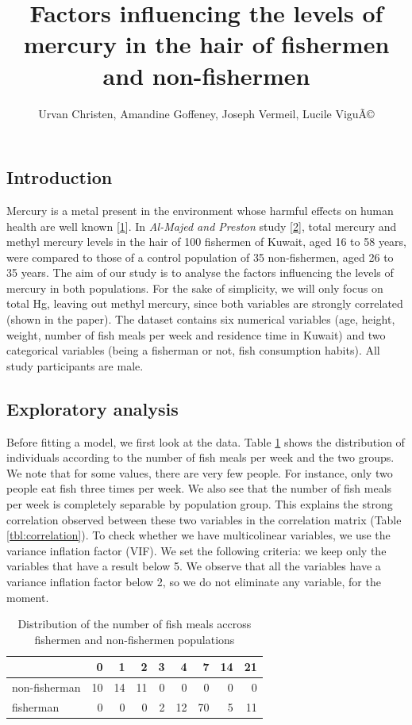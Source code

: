 \documentclass[12pt,]{article}
\title{Factors influencing the levels of mercury in the hair of fishermen and
non-fishermen}
\author{Urvan Christen, Amandine Goffeney, Joseph Vermeil, Lucile ViguÃ©}
\date{}
\begin{document}
\maketitle

\subsection{Introduction}\label{introduction}

Mercury is a metal present in the environment whose harmful effects on
human health are well known
{[}\protect\hyperlink{ref-park2012human}{1}{]}. In \emph{Al-Majed and
Preston} study {[}\protect\hyperlink{ref-al2000factors}{2}{]}, total
mercury and methyl mercury levels in the hair of 100 fishermen of
Kuwait, aged 16 to 58 years, were compared to those of a control
population of 35 non-fishermen, aged 26 to 35 years. The aim of our
study is to analyse the factors influencing the levels of mercury in
both populations. For the sake of simplicity, we will only focus on
total Hg, leaving out methyl mercury, since both variables are strongly
correlated (shown in the paper). The dataset contains six numerical
variables (age, height, weight, number of fish meals per week and
residence time in Kuwait) and two categorical variables (being a
fisherman or not, fish consumption habits). All study participants are
male.

\subsection{Exploratory analysis}\label{exploratory-analysis}

Before fitting a model, we first look at the data. Table
\ref{tbl:fishmlwk} shows the distribution of individuals according to
the number of fish meals per week and the two groups. We note that for
some values, there are very few people. For instance, only two people
eat fish three times per week. We also see that the number of fish meals
per week is completely separable by population group. This explains the
strong correlation observed between these two variables in the
correlation matrix (Table \ref{tbl:correlation}). To check whether we
have multicolinear variables, we use the variance inflation factor
(VIF). We set the following criteria: we keep only the variables that
have a result below 5. We observe that all the variables have a variance
inflation factor below 2, so we do not eliminate any variable, for the
moment.

\begin{table}[t]

\caption{\label{tab:unnamed-chunk-6}\label{tbl:fishmlwk}Distribution of the number of fish meals accross fishermen and non-fishermen populations}
\centering
\begin{tabular}{lrrrrrrrr}
\toprule
  & 0 & 1 & 2 & 3 & 4 & 7 & 14 & 21\\
\midrule
\rowcolor{gray!6}  non-fisherman & 10 & 14 & 11 & 0 & 0 & 0 & 0 & 0\\
fisherman & 0 & 0 & 0 & 2 & 12 & 70 & 5 & 11\\
\bottomrule
\end{tabular}
\end{table}
\end{document}
